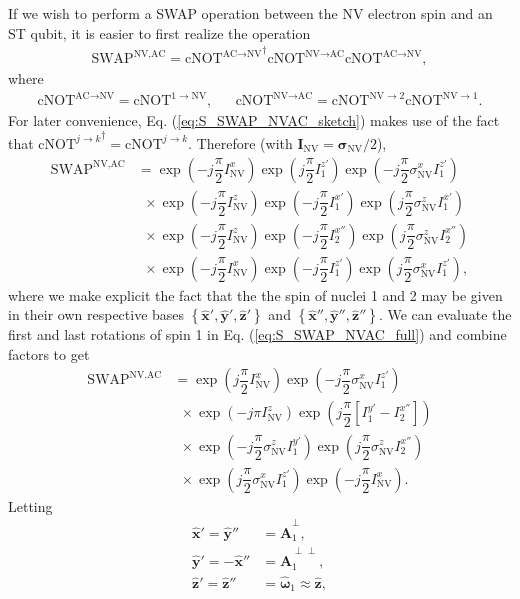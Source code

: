 \documentclass[twocolumn]{revtex4-1}
\renewcommand{\t}{\text} %
\newcommand{\f}[2]{\dfrac{#1}{#2}} %
\newcommand{\p}[1]{\left(#1\right)} %
\renewcommand{\sp}[1]{\left[#1\right]} %
\renewcommand{\set}[1]{\left\{#1\right\}} %
\renewcommand{\v}{\bm} %
\newcommand{\uv}[1]{\hat{\v{#1}}} %
\newcommand{\SWAP}{\t{SWAP}}
\newcommand{\cNOT}{\t{cNOT}}
\newcommand{\NV}{\t{NV}}
\newcommand{\AC}{\t{AC}}
\begin{document}
If we wish to perform a SWAP operation between the NV electron spin
and an ST qubit, it is easier to first realize the operation
\begin{align}
  \SWAP^{\NV,\AC}
  = {\cNOT^{\AC\to\NV}}^\dagger\cNOT^{\NV\to\AC}\cNOT^{\AC\to\NV},
  \label{eq:S_SWAP_NVAC_sketch}
\end{align}
where
\begin{align}
  \cNOT^{\AC\to\NV} = \cNOT^{1\to\NV},
  && \cNOT^{\NV\to\AC} = \cNOT^{\NV\to2}\cNOT^{\NV\to1}.
\end{align}
For later convenience, Eq. (\ref{eq:S_SWAP_NVAC_sketch}) makes use of
the fact that ${\cNOT^{j\to k}}^\dagger=\cNOT^{j\to k}$. Therefore
(with $\v I_\NV=\v\sigma_\NV/2$),
\begin{align}
  \SWAP^{\NV,\AC}
  &= \exp\p{-j\f\pi2 I_\NV^x} \exp\p{j\f\pi2 I_1^{z'}}
    \exp\p{-j\f\pi2 \sigma_\NV^x I_1^{z'}} \tag*{} \\
  &~~\times \exp\p{-j\f\pi2 I_\NV^z} \exp\p{-j\f\pi2 I_1^{x'}}
    \exp\p{j\f\pi2 \sigma_\NV^z I_1^{x'}} \tag*{} \\
  &~~\times \exp\p{-j\f\pi2 I_\NV^z} \exp\p{-j\f\pi2 I_2^{x''}}
    \exp\p{j\f\pi2 \sigma_\NV^z I_2^{x''}} \tag*{} \\
  &~~\times \exp\p{-j\f\pi2 I_\NV^x} \exp\p{-j\f\pi2 I_1^{z'}}
    \exp\p{j\f\pi2 \sigma_\NV^x I_1^{z'}},
    \label{eq:S_SWAP_NVAC_full}
\end{align}
where we make explicit the fact that the the spin of nuclei 1 and 2
may be given in their own respective bases
$\set{\uv x',\uv y',\uv z'}$ and $\set{\uv x'',\uv y'',\uv z''}$. We
can evaluate the first and last rotations of spin 1 in
Eq. (\ref{eq:S_SWAP_NVAC_full}) and combine factors to get
\begin{align}
  \SWAP^{\NV,\AC}
  &= \exp\p{j\f\pi2 I_\NV^x} \exp\p{-j\f\pi2 \sigma_\NV^x I_1^{z'}}
    \tag*{} \\
  &~~\times \exp\p{-j\pi I_\NV^z} \exp\p{j\f\pi2\sp{I_1^{y'}-I_2^{x''}}}
    \tag*{} \\
  &~~\times \exp\p{-j\f\pi2 \sigma_\NV^z I_1^{y'}}
    \exp\p{j\f\pi2 \sigma_\NV^z I_2^{x''}} \tag*{} \\
  &~~\times \exp\p{j\f\pi2 \sigma_\NV^x I_1^{z'}}
    \exp\p{-j\f\pi2 I_\NV^x}.
\end{align}
Letting
\begin{align}
  \uv x' = \uv y'' &= \uv A_1^\perp, \\
  \uv y' = -\uv x'' &= \uv A_1^{\perp\perp}, \\
  \uv z' = \uv z'' &= \uv\omega_1\approx\uv z, \label{eq:S_w=z}
\end{align}
\end{document}
